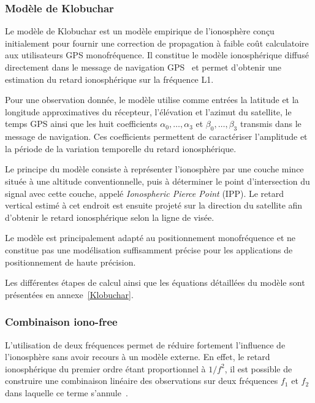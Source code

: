\subsubsection{Modèle de Klobuchar}

Le modèle de Klobuchar est un modèle empirique de l'ionosphère conçu
initialement pour fournir une correction de propagation à faible coût
calculatoire aux utilisateurs GPS monofréquence. Il constitue le modèle
ionosphérique diffusé directement dans le message de navigation GPS~\cite{klobuchar1987} et
permet d'obtenir une estimation du retard ionosphérique sur la fréquence
L1.

Pour une observation donnée, le modèle utilise comme entrées la latitude et
la longitude approximatives du récepteur, l'élévation et l'azimut du
satellite, le temps GPS ainsi que les huit coefficients $\alpha_0,\ldots,
\alpha_3$ et $\beta_0,\ldots,\beta_3$ transmis dans le message de navigation.
Ces coefficients permettent de caractériser l'amplitude et la période de la
variation temporelle du retard ionosphérique. 

Le principe du modèle consiste à représenter l'ionosphère par une couche
mince située à une altitude conventionnelle, puis à déterminer le point
d'intersection du signal avec cette couche, appelé \textit{Ionospheric
Pierce Point} (IPP). Le retard vertical estimé à cet endroit est ensuite
projeté sur la direction du satellite afin d'obtenir le retard
ionosphérique selon la ligne de visée.

Le modèle est principalement adapté au positionnement monofréquence et
ne constitue pas une modélisation suffisamment précise pour les applications
de positionnement de haute précision.

Les différentes étapes de calcul ainsi que les équations détaillées du
modèle sont présentées en annexe~\ref{Klobuchar}.

\subsubsection{Combinaison iono-free}

L'utilisation de deux fréquences permet de réduire fortement l'influence
de l'ionosphère sans avoir recours à un modèle externe. En effet, le retard
ionosphérique du premier ordre étant proportionnel à $1/f^2$, il est
possible de construire une combinaison linéaire des observations sur deux
fréquences $f_1$ et $f_2$ dans laquelle ce terme s'annule~\cite{hauschild2017combinations}.

